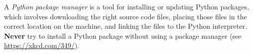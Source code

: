 A \emph{Python package manager} is a tool for installing or updating Python packages, which involves downloading the right source code files, placing those files in the correct location on the machine, and linking the files to the Python interpreter.
\textbf{Never} try to install a Python package without using a package manager (see \url{https://xkcd.com/349/}).
%
%
%
%
%
%
%
%
%
%

